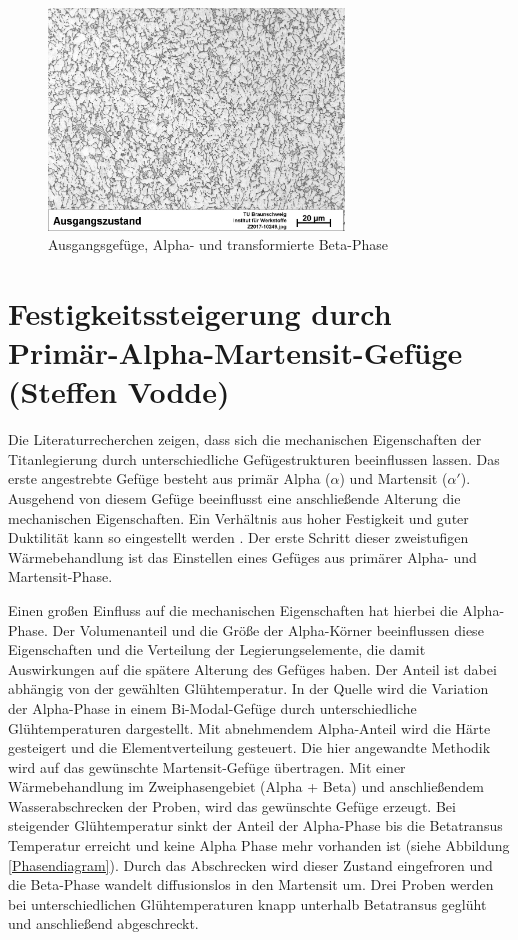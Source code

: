 \documentclass[a4paper, 11pt]{tubsreprt}
\begin{document}
\begin{figure}[h]
\centering
\includegraphics[width=0.7\textwidth]{Bilder/Ausgangsgefuege.jpg}
\caption{Ausgangsgefüge, Alpha- und transformierte Beta-Phase}
\label{ausgangsgefüge Kapitel3}
\end{figure}

\newpage
\section{Festigkeitssteigerung durch Primär-Alpha-Martensit-Gefüge (Steffen Vodde)}\label{Festigkeitssteigerung durch Martensitbildung}
Die Literaturrecherchen zeigen, dass sich die mechanischen Eigenschaften der Titanlegierung durch unterschiedliche Gefügestrukturen beeinflussen lassen. Das erste angestrebte Gefüge besteht aus primär Alpha ($\alpha$) und Martensit ($\alpha'$). Ausgehend von diesem Gefüge beeinflusst eine anschließende Alterung die mechanischen Eigenschaften. Ein  Verhältnis aus hoher Festigkeit und guter Duktilität kann so eingestellt werden \cite{Gilbert1990}. Der erste Schritt dieser zweistufigen Wärmebehandlung ist das Einstellen eines Gefüges aus primärer Alpha- und Martensit-Phase.
 
Einen großen Einfluss auf die mechanischen Eigenschaften hat hierbei die Alpha-Phase. Der Volumenanteil und die Größe der Alpha-Körner beeinflussen diese Eigenschaften und die Verteilung der Legierungselemente, die damit Auswirkungen auf die spätere Alterung des Gefüges haben. Der Anteil ist dabei abhängig von der gewählten Glühtemperatur. In der Quelle \cite{Sahoo2015} wird die Variation der Alpha-Phase in einem Bi-Modal-Gefüge durch unterschiedliche Glühtemperaturen dargestellt. Mit abnehmendem Alpha-Anteil wird die Härte gesteigert und die Elementverteilung gesteuert. Die hier angewandte Methodik wird auf das gewünschte Martensit-Gefüge übertragen.
Mit einer Wärmebehandlung im Zweiphasengebiet (Alpha + Beta) und anschließendem Wasserabschrecken der Proben, wird das gewünschte Gefüge erzeugt. Bei steigender Glühtemperatur sinkt der Anteil der Alpha-Phase bis die Betatransus Temperatur erreicht und keine Alpha Phase mehr vorhanden ist (siehe Abbildung \ref{Phasendiagram}).  Durch das Abschrecken wird dieser Zustand eingefroren und die Beta-Phase wandelt diffusionslos in den Martensit um. Drei Proben werden bei unterschiedlichen Glühtemperaturen knapp unterhalb Betatransus geglüht und anschließend abgeschreckt.
\end{document}
